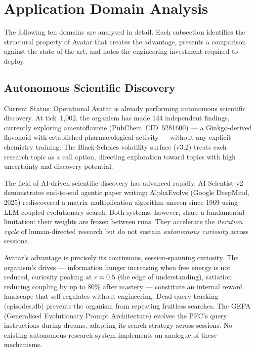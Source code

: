 \documentclass[12pt,a4paper]{article}
\begin{document}
\section{Application Domain Analysis}

The following ten domains are analysed in detail. Each subsection identifies the
structural property of Avatar that creates the advantage, presents a comparison against
the state of the art, and notes the engineering investment required to deploy.

\subsection{Autonomous Scientific Discovery}

\begin{findingbox}{Current Status: Operational}
Avatar is already performing autonomous scientific discovery. At tick~1{,}002, the
organism has made 144 independent findings, currently exploring amentoflavone
(PubChem~CID~5281600) --- a Ginkgo-derived flavonoid with established pharmacological
activity --- without any explicit chemistry training. The Black-Scholes volatility surface
(v3.2) treats each research topic as a call option, directing exploration toward topics
with high uncertainty and discovery potential.
\end{findingbox}

The field of AI-driven scientific discovery has advanced rapidly. AI Scientist-v2 \cite{aiScientist2025} demonstrates end-to-end agentic paper writing; AlphaEvolve (Google DeepMind, 2025) rediscovered a matrix multiplication algorithm unseen since 1969 using LLM-coupled evolutionary search. Both systems, however, share a fundamental limitation: their weights are frozen between runs. They accelerate the \emph{iteration cycle} of human-directed research but do not sustain \emph{autonomous curiosity} across sessions.

Avatar's advantage is precisely its continuous, session-spanning curiosity. The organism's drives --- information hunger increasing when free energy is not reduced, curiosity peaking at $r \approx 0.5$ (the edge of understanding), satiation reducing coupling by up to 80\% after mastery --- constitute an internal reward landscape that self-regulates without engineering. Dead-query tracking (episodes.db) prevents the organism from repeating fruitless searches. The GEPA (Generalised Evolutionary Prompt Architecture) evolves the PFC's query instructions during dreams, adapting its search strategy across sessions. No existing autonomous research system implements an analogue of these mechanisms.
\end{document}
